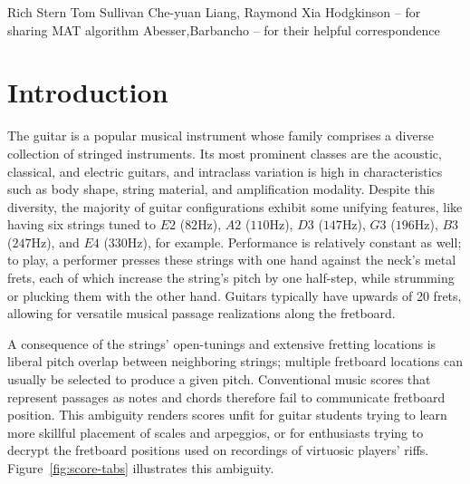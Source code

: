 \documentclass[12pt]{cmuthesis}
\begin{document}
\begin{acknowledgments}
Rich Stern
Tom Sullivan
Che-yuan Liang, Raymond Xia
Hodgkinson -- for sharing MAT algorithm
Abesser,Barbancho -- for their helpful correspondence
\end{acknowledgments}



\tableofcontents
\listoffigures
\listoftables

\mainmatter


%
%
%
%
%
\doublespacing
\noindent
\chapter{Introduction} 
The guitar is a popular musical instrument whose family comprises a diverse collection of stringed instruments. Its most prominent classes are the acoustic, classical, and electric guitars, and intraclass variation is high in characteristics such as body shape, string material, and amplification modality. Despite this diversity, the majority of guitar configurations exhibit some unifying features, like having six strings tuned to $E2$ ($82$Hz), $A2$ ($110$Hz), $D3$ ($147$Hz), $G3$ ($196$Hz), $B3$ ($247$Hz), and $E4$ ($330$Hz), for example. Performance is relatively constant as well; to play, a performer presses these strings with one hand against the neck's metal frets, each of which increase the string's pitch by one half-step, while strumming or plucking them with the other hand. Guitars typically have upwards of 20 frets, allowing for versatile musical passage realizations along the fretboard.

A consequence of the strings' open-tunings and extensive fretting locations is liberal pitch overlap between neighboring strings; multiple fretboard locations can usually be selected to produce a given pitch. Conventional music scores that represent passages as notes and chords therefore fail to communicate fretboard position. This ambiguity renders scores unfit for guitar students trying to learn more skillful placement of scales and arpeggios, or for enthusiasts trying to decrypt the fretboard positions used on recordings of virtuosic players' riffs. Figure~\ref{fig:score-tabs} illustrates this ambiguity.
\end{document}
